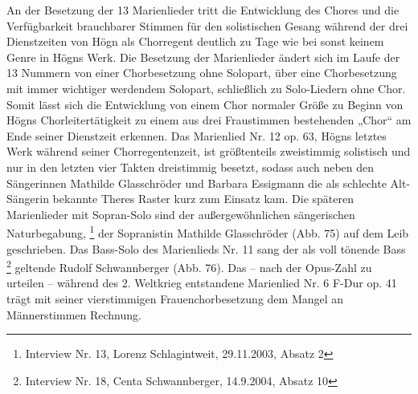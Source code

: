 \documentclass[a4paper]{article}
\newcounter{Abb}
\begin{document}
An der Besetzung der 13 Marienlieder tritt die Entwicklung des Chores
und die Verfügbarkeit brauchbarer Stimmen für den solistischen Gesang
während der drei Dienstzeiten von Högn als Chorregent deutlich zu Tage
wie bei sonst keinem Genre in Högns Werk. Die Besetzung der
Marienlieder ändert sich im Laufe der 13 Nummern von einer
Chorbesetzung ohne Solopart, über eine Chorbesetzung mit immer
wichtiger werdendem Solopart, schließlich zu Solo-Liedern ohne Chor.
Somit lässt sich die Entwicklung von einem Chor normaler Größe zu
Beginn von Högns Chorleitertätigkeit zu einem aus drei Fraustimmen
bestehenden „Chor“ am Ende seiner Dienstzeit erkennen. Das Marienlied
Nr. 12 op. 63, Högns letztes Werk während seiner Chorregentenzeit, ist
größtenteils zweistimmig solistisch und nur in den letzten vier Takten
dreistimmig besetzt, sodass auch neben den Sängerinnen Mathilde
Glasschröder und Barbara Essigmann die als schlechte Alt-Sängerin
bekannte Theres Raster kurz zum Einsatz kam. Die späteren Marienlieder
mit Sopran-Solo sind der außergewöhnlichen sängerischen
Naturbegabung, \footnote{Interview Nr. 13, Lorenz Schlagintweit,
29.11.2003, Absatz 2} der Sopranistin Mathilde Glasschröder (Abb. 75)
auf dem Leib geschrieben. Das Bass-Solo des Marienlieds Nr. 11 sang der
als voll tönende Bass \footnote{Interview Nr. 18, Centa Schwannberger,
14.9.2004, Absatz 10} geltende Rudolf Schwannberger (Abb. 76). Das –
nach der Opus-Zahl zu urteilen – während des 2. Weltkrieg entstandene
Marienlied Nr. 6 F-Dur op. 41 trägt mit seiner vierstimmigen
Frauenchorbesetzung dem Mangel an Männerstimmen Rechnung.
\end{document}
